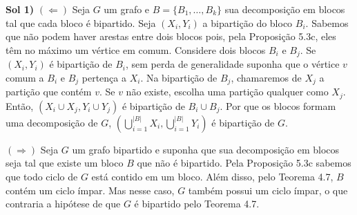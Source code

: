 
{\bf Sol 1)} $(\Leftarrow)$ Seja $G$ um grafo e $B = \{B_1, \dotsc, B_k\}$ sua
decomposição em blocos tal que cada bloco é bipartido. Seja $(X_i, Y_i)$ a
bipartição do bloco $B_i$. Sabemos que não podem haver arestas entre dois
blocos pois, pela Proposição 5.3c, eles têm no máximo um vértice em comum.
Considere dois blocos $B_i$ e $B_j$. Se $(X_i,Y_i)$ é bipartição de $B_i$, sem
perda de generalidade suponha que o vértice $v$ comum a $B_i$ e $B_j$ pertença
a $X_i$. Na bipartição de $B_j$, chamaremos de $X_j$ a partição que contém $v$.
Se $v$ não existe, escolha uma partição qualquer como $X_j$. Então, $(X_i \cup
X_j, Y_i \cup Y_j)$ é bipartição de $B_i \cup B_j$. Por que os blocos formam
uma decomposição de $G$, $(\bigcup_{i=1}^{|B|} X_i, \bigcup_{i=1}^{|B|} Y_i)$ é
bipartição de $G$.

$(\Rightarrow)$ Seja $G$ um grafo bipartido e suponha que sua decomposição em
blocos seja tal que existe um bloco $B$ que não é bipartido. Pela Proposição
5.3c sabemos que todo ciclo de $G$ está contido em um bloco. Além disso, pelo
Teorema 4.7, $B$ contém um ciclo ímpar. Mas nesse caso, $G$ também possui um
ciclo ímpar, o que contraria a hipótese de que $G$ é bipartido pelo Teorema
4.7.

